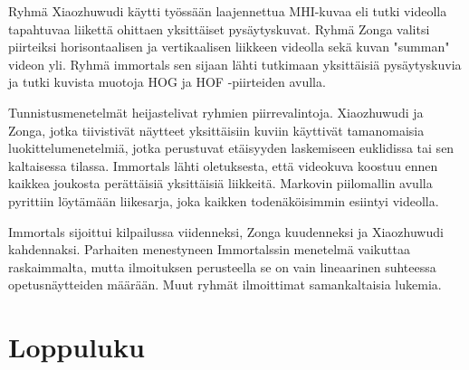 Ryhmä Xiaozhuwudi käytti työssään laajennettua MHI-kuvaa eli tutki videolla tapahtuvaa liikettä ohittaen yksittäiset pysäytyskuvat.
Ryhmä Zonga valitsi piirteiksi horisontaalisen ja vertikaalisen liikkeen videolla sekä kuvan "summan" videon yli. 
Ryhmä immortals sen sijaan lähti tutkimaan yksittäisiä pysäytyskuvia ja tutki kuvista muotoja HOG ja HOF -piirteiden avulla.

Tunnistusmenetelmät heijastelivat ryhmien piirrevalintoja. Xiaozhuwudi ja Zonga, jotka tiivistivät näytteet 
yksittäisiin kuviin käyttivät tamanomaisia luokittelumenetelmiä, jotka perustuvat etäisyyden laskemiseen euklidissa tai sen kaltaisessa tilassa.
Immortals lähti oletuksesta, että videokuva koostuu ennen kaikkea joukosta perättäisiä yksittäisiä liikkeitä.
Markovin piilomallin avulla pyrittiin löytämään liikesarja, joka kaikken todenäköisimmin esiintyi videolla.

Immortals sijoittui kilpailussa viidenneksi, Zonga kuudenneksi ja Xiaozhuwudi kahdennaksi. Parhaiten menestyneen Immortalssin
menetelmä vaikuttaa raskaimmalta, mutta ilmoituksen perusteella se on vain lineaarinen suhteessa opetusnäytteiden määrään.
Muut ryhmät ilmoittimat samankaltaisia lukemia.























\section{Loppuluku}




